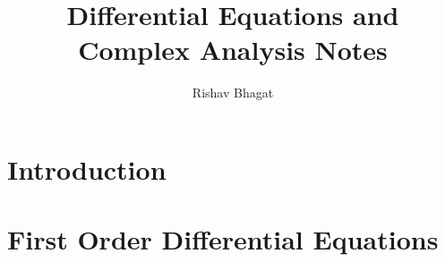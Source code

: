 \title{Differential Equations and Complex Analysis Notes}

\author{Rishav Bhagat}

\maketitle
\chapter{Introduction}
    
    
    
    \graphicspath{{../chapter_1/section_1.4/}}
    
\chapter{First Order Differential Equations}